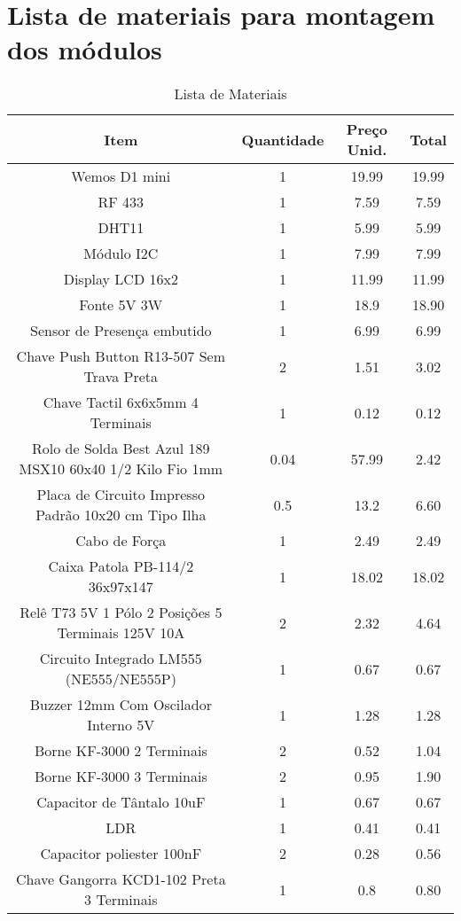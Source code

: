 \chapter{Lista de materiais para montagem dos módulos}
\label{listamateriais}

\begin{table}[hbp]
	\caption{Lista de Materiais}
	\setlength\tabcolsep{1.5pt}
	\centering
	\footnotesize
	\begin{tabular}{cccc}
		\toprule
		\textbf{Item} & \textbf{Quantidade} & \textbf{Preço Unid.} & \textbf{Total} \\
		\midrule
		Wemos D1 mini & 1 & 19.99 & 19.99 \\
		RF 433 & 1 & 7.59 & 7.59 \\
		DHT11 & 1 & 5.99 & 5.99 \\
		Módulo I2C & 1 & 7.99 & 7.99 \\
		Display LCD 16x2 & 1 & 11.99 & 11.99 \\
		Fonte 5V 3W & 1 & 18.9 & 18.90 \\
		Sensor de Presença embutido & 1 & 6.99 & 6.99 \\
		Chave Push Button R13-507 Sem Trava Preta & 2 & 1.51 & 3.02 \\
		Chave Tactil 6x6x5mm 4 Terminais & 1 & 0.12 & 0.12 \\
		Rolo de Solda Best Azul 189 MSX10 60x40 1/2 Kilo Fio 1mm & 0.04 & 57.99 & 2.42 \\
		Placa de Circuito Impresso Padrão 10x20 cm Tipo Ilha & 0.5 & 13.2 & 6.60 \\
		Cabo de Força & 1 & 2.49 & 2.49 \\
		Caixa Patola PB-114/2 36x97x147 & 1 & 18.02 & 18.02 \\
		Relê T73 5V 1 Pólo 2 Posições 5 Terminais 125V 10A & 2 & 2.32 & 4.64 \\
		Circuito Integrado LM555 (NE555/NE555P) & 1 & 0.67 & 0.67 \\
		Buzzer 12mm Com Oscilador Interno 5V & 1 & 1.28 & 1.28 \\
		Borne KF-3000 2 Terminais & 2 & 0.52 & 1.04 \\
		Borne KF-3000 3 Terminais & 2 & 0.95 & 1.90 \\
		Capacitor de Tântalo 10uF & 1 & 0.67 & 0.67 \\
		LDR & 1 & 0.41 & 0.41 \\
		Capacitor poliester 100nF & 2 & 0.28 & 0.56 \\
		Chave Gangorra KCD1-102 Preta 3 Terminais & 1 & 0.8 & 0.80 \\

\end{tabular}
\end{table}
